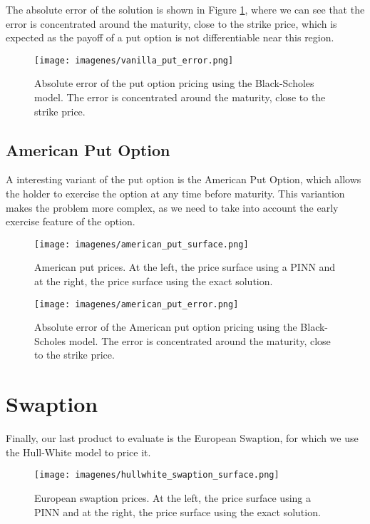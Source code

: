 \documentclass[12pt]{report} %
\theoremstyle{plain}           %
\theoremstyle{definition}      %
\theoremstyle{remark}          %
\begin{document}
The absolute error of the solution is shown in Figure \ref{fig:put_option_error}, 
where we can see that the error is concentrated around the maturity, 
close to the strike price, which is expected as the payoff of 
a put option is not differentiable near this region.

\begin{figure}[H]
	\centering
	\texttt{[image: imagenes/vanilla\_put\_error.png]}
	\caption{Absolute error of the put option pricing using the Black-Scholes model. The error is concentrated around the maturity, close to the strike price.}
	\label{fig:put_option_error}
\end{figure}

\subsection{American Put Option}

A interesting variant of the put option is the American Put Option, which allows the holder to exercise the option at any time before maturity.
This variantion makes the problem more complex, as we need to take into account the early exercise feature of the option.

\begin{figure}[H]
	\centering
	\texttt{[image: imagenes/american\_put\_surface.png]}
	\caption{American put prices. At the left, the price surface using a PINN and at the right, the price surface using the exact solution.}
	\label{fig:american_put_option}
\end{figure}

\begin{figure}[H]
	\centering
	\texttt{[image: imagenes/american\_put\_error.png]}
	\caption{Absolute error of the American put option pricing using the Black-Scholes model. The error is concentrated around the maturity, close to the strike price.}
	\label{fig:american_put_option_error}
\end{figure}

\section{Swaption}

Finally, our last product to evaluate is the European Swaption, for which we use the Hull-White model to price it.

\begin{figure}
	\centering
	\texttt{[image: imagenes/hullwhite\_swaption\_surface.png]}
	\caption{European swaption prices. At the left, the price surface using a PINN and at the right, the price surface using the exact solution.}
	\label{fig:swaption_surface}
\end{figure}
\end{document}
